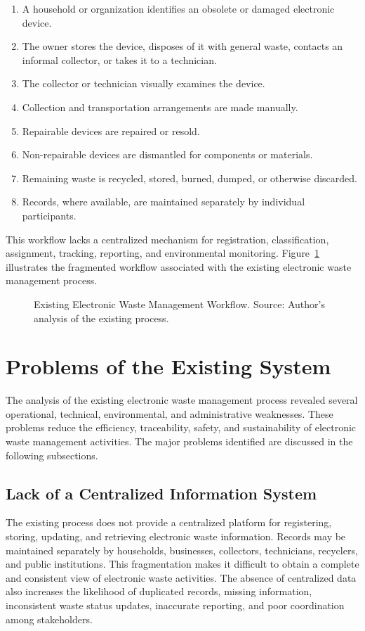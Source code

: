 \begin{enumerate}[leftmargin=1.4cm]
  \item A household or organization identifies an obsolete or damaged electronic
    device.
  \item The owner stores the device, disposes of it with general waste, contacts an
    informal collector, or takes it to a technician.
  \item The collector or technician visually examines the device.
  \item Collection and transportation arrangements are made manually.
  \item Repairable devices are repaired or resold.
  \item Non-repairable devices are dismantled for components or materials.
  \item Remaining waste is recycled, stored, burned, dumped, or otherwise
    discarded.
  \item Records, where available, are maintained separately by individual
    participants.
\end{enumerate}

This workflow lacks a centralized mechanism for registration, classification,
assignment, tracking, reporting, and environmental monitoring.
Figure~\ref{fig:existing-workflow} illustrates the fragmented workflow associated
with the existing electronic waste management process.

\begin{figure}[H]
  \centering
  \caption{Existing Electronic Waste Management Workflow. Source: Author's analysis of the existing process.}
  \label{fig:existing-workflow}
\end{figure}

\section{Problems of the Existing System}

The analysis of the existing electronic waste management process revealed
several operational, technical, environmental, and administrative weaknesses.
These problems reduce the efficiency, traceability, safety, and sustainability of
electronic waste management activities. The major problems identified are
discussed in the following subsections.

\subsection{Lack of a Centralized Information System}
The existing process does not provide a centralized platform for registering,
storing, updating, and retrieving electronic waste information. Records may be
maintained separately by households, businesses, collectors, technicians,
recyclers, and public institutions. This fragmentation makes it difficult to obtain a
complete and consistent view of electronic waste activities. The absence of
centralized data also increases the likelihood of duplicated records, missing
information, inconsistent waste status updates, inaccurate reporting, and poor
coordination among stakeholders.

